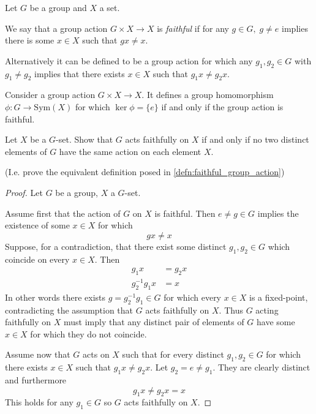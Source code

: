 \begin{defn} 
    \label{defn:faithful_group_action}
    Let $G$ be a group and $X$ a set. 

    We say that a group action $G \times X \to X$ is \emph{faithful} 
    if for any $g \in G, \; g\neq e$ implies there is some 
    $x \in X$ such that $g x \neq x$. 

    Alternatively it can be defined to be a group action for which 
    any $g_1,g_2 \in G$ with $g_1 \neq g_2$ implies that there 
    exists $x \in X$ such that $g_1 x \neq g_2 x$. 
 \end{defn}
 \begin{prop}
     Consider a group action $G \times X \to X$. 
     It defines a group homomorphism 
     $\phi : G \to \text{Sym}(X)$ for which 
     $\ker \phi = \{e\}$ if and only if the group action is 
     faithful. 
 \end{prop}
\newpage 
 \begin{prob}
     Let $X$ be a $G$-set. Show that $G$ acts faithfully on $X$ 
     if and only if no two distinct elements of $G$ have the same 
     action on each element $X$. 

     (I.e. prove the equivalent definition posed in 
     \cref{defn:faithful_group_action}) 
 \end{prob}
 \begin{proof}
    Let $G$ be a group, $X$ a $G$-set.  

    Assume first that the action of $G$ on $X$ is faithful. 
    Then $e \neq g \in G$ implies the existence of some 
    $x \in X$ for which 
    \[
        gx \neq x
    \]
    Suppose, for a contradiction, that there exist some 
    distinct $g_1,g_2 \in G$ which coincide on every $x \in X$. 
    Then 
    \begin{align*}
        g_1 x &= g_2 x \\ 
        g_2^{-1}g_1x &= x
    \end{align*}
    In other words there exists $g = g_2^{-1}g_1 \in G$ 
    for which every $x \in X$ is a fixed-point, contradicting 
    the assumption that $G$ acts faithfully on $X$. Thus $G$ acting 
    faithfully on $X$ must imply that any distinct pair of elements 
    of $G$ have some $x \in X$ for which they do not coincide. 

    Assume now that $G$ acts on $X$ such that for every 
    distinct $g_1,g_2 \in G$ for which there exists $x \in X$ 
    such that $g_1 x \neq g_2 x$. Let $g_2 = e \neq g_1$. 
    They are clearly distinct and furthermore 
    \[
        g_1 x \neq g_2x = x
    \]
    This holds for any $g_1 \in G$ so $G$ acts faithfully on $X$.  
 \end{proof}

